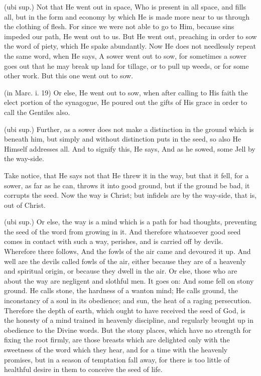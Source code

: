  (ubi sup.) Not that He went out in space, Who is present in all space, and fills all, but in the form and economy by which He is made more near to us through the clothing of flesh. For since we were not able to go to Him, because sins impeded our path, He went out to us. But He went out, preaching in order to sow the word of piety, which He spake abundantly. Now He does not needlessly repeat the same word, when He says, A sower went out to sow, for sometimes a sower goes out that he may break up land for tillage, or to pull up weeds, or for some other work. But this one went out to sow.

 (in Marc. i. 19) Or else, He went out to sow, when after calling to His faith the elect portion of the synagogue, He poured out the gifts of His grace in order to call the Gentiles also.

 (ubi sup.) Further, as a sower does not make a distinction in the ground which is beneath him, but simply and without distinction puts in the seed, so also He Himself addresses all. And to signify this, He says, And as he sowed, some Jell by the way-side.

 Take notice, that He says not that He threw it in the way, but that it fell, for a sower, as far as he can, throws it into good ground, but if the ground be bad, it corrupts the seed. Now the way is Christ; but infidels are by the way-side, that is, out of Christ.

 (ubi sup.) Or else, the way is a mind which is a path for bad thoughts, preventing the seed of the word from growing in it. And therefore whatsoever good seed comes in contact with such a way, perishes, and is carried off by devils. Wherefore there follows, And the fowls of the air came and devoured it up. And well are the devils called fowls of the air, either because they are of a heavenly and spiritual origin, or because they dwell in the air. Or else, those who are about the way are negligent and slothful men. It goes on: And some fell on stony ground. He calls stone, the hardness of a wanton mind; He calls ground, the inconstancy of a soul in its obedience; and sun, the heat of a raging persecution. Therefore the depth of earth, which ought to have received the seed of God, is the honesty of a mind trained in heavenly discipline, and regularly brought up in obedience to the Divine words. But the stony places, which have no strength for fixing the root firmly, are those breasts which are delighted only with the sweetness of the word which they hear, and for a time with the heavenly promises, but in a season of temptation fall away, for there is too little of healthful desire in them to conceive the seed of life.

